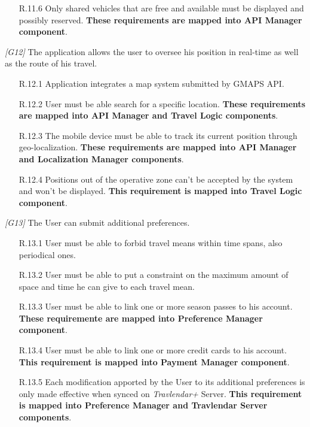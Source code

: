 \begin{description}
\begin{itemize}
			\item[R.11.6] Only shared vehicles that are free and available must be displayed and possibly reserved.
			\textbf{These requirements are mapped into API Manager component}.
		\end{itemize}


	\vskip0.75cm
	\item \textit{[G12]} The application allows the user to oversee his position in real-time as well as the route of his travel.
		\begin{itemize}
			\item [R.12.1] Application integrates a map system submitted by GMAPS API.

			\item [R.12.2] User must be able search for a specific location.
			\textbf{These requirements are mapped into API Manager and Travel Logic components}.

			\item [R.12.3] The mobile device must be able to track its current position through geo-localization.
			\textbf{These requirements are mapped into API Manager and Localization Manager components}.

			\item [R.12.4] Positions out of the operative zone can't be accepted by the system and won't be displayed.			
			\textbf{This requirement is mapped into Travel Logic component}.

		\end{itemize}


	\vskip0.75cm
	\item \textit{[G13]} The User can submit additional preferences.
		\begin{itemize}
			\item[R.13.1] User must be able to forbid travel means within time spans, also periodical ones.

			\item[R.13.2] User must be able to put a constraint on the maximum amount of space and time he can give to each travel mean.

			\item[R.13.3] User must be able to link one or more season passes to his account.
			\textbf{These requiremente are mapped into Preference Manager component}.
			
			\item[R.13.4] User must be able to link one or more credit cards to his account.
			\textbf{This requirement is mapped into Payment Manager component}.

			\item[R.13.5] Each modification apported by the User to its additional preferences is only made effective when synced on \textit{Travlendar+} Server.
			\textbf{This requirement is mapped into Preference Manager and Travlendar Server components}.
		\end{itemize}
\end{description}
